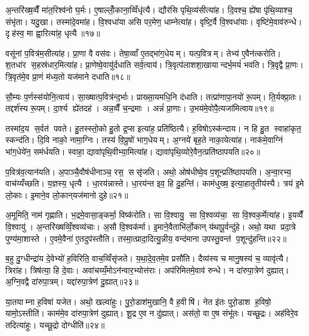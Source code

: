 अ॒न्तरि॑ख्ष॒व्वैँ मा॑त॒रिश्व॑नो घ॒र्मः। ए॒षाल्लोँ॒काना॒व्विँधृ॑त्यै। द्यौर॑सि पृथि॒व्य॑सीत्या॑ह। दि॒वश्च॒ ह्ये॑षा पृ॑थि॒व्याश्च॒ संभृ॑ता। यदु॒खा। तस्मा॑दे॒वमा॑ह। वि॒श्वधा॑या असि पर॒मेण॒ धाम्नेत्या॑ह। वृष्टि॒र्वै वि॒श्वधा॑याः। वृष्टि॑मे॒वाव॑रुन्धे। दृह॑स्व॒ मा ह्वा॒रित्या॑ह॒ धृत्यै॥१७॥

वसू॑नां प॒वित्र॑म॒सीत्या॑ह। प्रा॒णा वै वस॑वः। तेषा॒व्वाँ ए॒तद्भा॑ग॒धेयम्। यत्प॒वित्रम्। तेभ्य॑ ए॒वैन॑त्करोति। श॒तधा॑र स॒हस्र॑धार॒मित्या॑ह। प्रा॒णेष्वे॒वायु॑र्दधाति सर्व॒त्वाय॑। त्रि॒वृत्प॑लाशशा॒खायान्दर्भ॒मयं॑ भवति। त्रि॒वृद्वै प्रा॒णः। त्रि॒वृत॑मे॒व प्रा॒णं म॑ध्य॒तो यज॑माने दधाति॥१८॥

सौ॒म्यः प॒र्णस्स॑योनि॒त्वाय॑। सा॒ख्षात्प॒वित्र॑न्द॒र्भाः। प्राख्सा॒यमधि॒नि द॑धाति। तत्प्रा॑णापा॒नयो॑ रू॒पम्। ति॒र्यक्प्रा॒तः। तद्दर्श॑स्य रू॒पम्। दा॒र्श्य ह्ये॑तदह॑। अन्न॒व्वैँ च॒न्द्रमाः। अन्नं॑ प्रा॒णाः। उ॒भय॑मे॒वोपै॒त्यजा॑मित्वाय॥१९॥

तस्मा॑द॒य स॒र्वत॑ पवते। हु॒तस्स्तो॒को हु॒तो द्र॒प्स इत्या॑ह॒ प्रति॑ष्ठित्यै। ह॒विषोऽस्क॑न्दाय। न हि हु॒त स्वाहा॑कृत॒ स्कन्द॑ति। दि॒वि नाको॒ नामा॒ग्निः। तस्य॑ वि॒प्रुषो॑ भाग॒धेयम्। अ॒ग्नये॑ बृह॒ते नाका॒येत्या॑ह। नाक॑मे॒वाग्निं भा॑ग॒धेये॑न॒ सम॑र्धयति। स्वाहा॒ द्यावा॑पृथि॒वीभ्या॒मित्या॑ह। द्यावा॑पृथि॒व्योरे॒वैन॒त्प्रति॑ष्ठापयति॥२०॥

प॒वित्र॑व॒त्यान॑यति। अ॒पाञ्चै॒वौष॑धीनाञ्च॒ रस॒ ससृ॑जति। अथो॒ ओष॑धीष्वे॒व प॒शून्प्रति॑ष्ठापयति। अ॒न्वा॒रभ्य॒ वाच॑य्यँच्छति। य॒ज्ञस्य॒ धृत्यै। धा॒रय॑न्नास्ते। धा॒रय॑न्त इव॒ हि दु॒हन्ति॑। काम॑धुख्ष॒ इत्या॒हातृ॒तीय॑स्यै। त्रय॑ इ॒मे लो॒काः। इ॒माने॒व लो॒कान्‌यज॑मानो दुहे॥२१॥

अ॒मूमिति॒ नाम॑ गृह्णाति। भ॒द्रमे॒वासा॒ङ्कर्मा॒ विष्क॑रोति। सा वि॒श्वायु॒ सा वि॒श्वव्य॑चा॒ सा वि॒श्वक॒र्मेत्या॑ह। इ॒यव्वैँ वि॒श्वायु॑। अ॒न्तरि॑ख्षव्विँ॒श्वव्य॑चाः। अ॒सौ वि॒श्वक॑र्मा। इ॒माने॒वैताभि॑र्लो॒कान्‌ य॑थापू॒र्वन्दु॑हे। अथो॒ यथा प्रदा॒त्रे पुण्य॑मा॒शास्ते। ए॒वमे॒वैना॑ ए॒तदुप॑स्तौति। तस्मा॒त्प्रादा॒दित्यु॒न्नीय॒ वन्द॑माना उपस्तु॒वन्त॑ प॒शून्दु॑हन्ति॥२२॥

ब॒हु दु॒ग्धीन्द्रा॑य दे॒वेभ्यो॑ ह॒विरिति॒ वाच॒व्विँसृ॑जते। य॒था॒दे॒व॒तमे॒व प्रसौ॑ति। दैव्य॑स्य च मानु॒षस्य॑ च॒ व्यावृ॑त्यै। त्रिरा॑ह। त्रिष॑त्या॒ हि दे॒वाः। अवा॑चय्यँ॒मोऽन॑न्वार॒भ्योत्त॑राः। अप॑रिमितमे॒वाव॑ रुन्धे। न दा॑रुपा॒त्रेण॑ दुह्यात्। अ॒ग्नि॒वद्वै दा॑रुपा॒त्रम्। यद्दा॑रुपा॒त्रेण॑ दु॒ह्यात्॥२३॥

या॒तयाम्ना ह॒विषा॑ यजेत। अथो॒ खल्वा॑हुः। पु॒रो॒डाश॑मुखानि॒ वै ह॒वीषि॑। नेत इ॑तः पुरो॒डाश ह॒विषो॒ यामो॒ऽस्तीति॑। काम॑मे॒व दा॑रुपा॒त्रेण॑ दुह्यात्। शू॒द्र ए॒व न दु॑ह्यात्। अस॑तो॒ वा ए॒ष संभू॑तः। यच्छू॒द्रः। अह॑विरे॒व तदित्या॑हुः। यच्छू॒द्रो दोग्धीति॑॥२४॥

